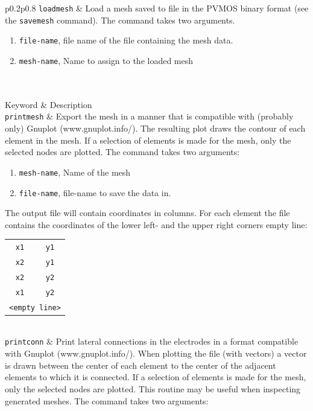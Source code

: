 \documentclass[noshowpacs,preprintnumbers,amsmath,amssymb, letter]{revtex4}
\begin{document}
\begin{longtable}{p{}p{}}
\texttt{loadmesh}	& Load a mesh saved to file in the PVMOS binary format (see the \texttt{savemesh} command). The command takes two arguments.
\begin{enumerate}
\item \texttt{file-name}, file name of the file containing the mesh data.
\item \texttt{mesh-name}, Name to assign to the loaded mesh
\end{enumerate}\\
 \\*
\hline
Keyword & Description \\
\texttt{printmesh}	& Export the mesh in a manner that is compatible with (probably only) Gnuplot (www.gnuplot.info/). The resulting plot draws the contour of each element in the mesh. If a selection of elements is made for the mesh, only the selected nodes are plotted. The command takes two arguments:
\begin{enumerate}
\item \texttt{mesh-name}, Name of the mesh
\item \texttt{file-name}, file-name to save the data in.
\end{enumerate}
The output file will contain coordinates in columns. For each element the file contains the coordinates of the lower left- and the upper right corners empty line:\newline 
\begin{tabular}{cc}
	\texttt{x1} & \texttt{y1} \\
	\texttt{x2} & \texttt{y1} \\
	\texttt{x2} & \texttt{y2} \\
	\texttt{x1} & \texttt{y2} \\
	\multicolumn{2}{l}{\texttt{<empty line>}}\\
\end{tabular}\\
\texttt{printconn}	& Print lateral connections in the electrodes in a format compatible with Gnuplot (www.gnuplot.info/). When plotting the file (with vectors) a vector is drawn between the center of each element to the center of the adjacent elements to which it is connected. If a selection of elements is made for the mesh, only the selected nodes are plotted. This routine may be useful when inspecting generated meshes. The command takes two arguments:

\end{longtable}
\end{document}
